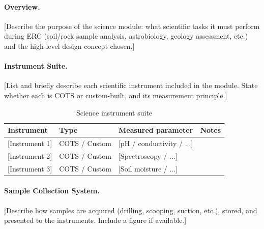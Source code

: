 %

\paragraph{Overview.}
[Describe the purpose of the science module: what scientific tasks it must
perform during ERC (soil/rock sample analysis, astrobiology, geology assessment,
etc.) and the high-level design concept chosen.]

\paragraph{Instrument Suite.}
[List and briefly describe each scientific instrument included in the module.
State whether each is COTS or custom-built, and its measurement principle.]

\begin{table}[H]
    \centering
    \caption{Science instrument suite}
    \label{tab:science_instruments}
    \begin{tabular}{L{3cm} L{2cm} L{4cm} L{3cm}}
        \toprule
        \textbf{Instrument}       & \textbf{Type} & \textbf{Measured parameter} & \textbf{Notes} \\
        \midrule
        {[Instrument 1]} & COTS / Custom & [pH / conductivity / ...] & \\
        {[Instrument 2]} & COTS / Custom & [Spectroscopy / ...] & \\
        {[Instrument 3]} & COTS / Custom & [Soil moisture / ...] & \\
        \bottomrule
    \end{tabular}
\end{table}

\paragraph{Sample Collection System.}
[Describe how samples are acquired (drilling, scooping, suction, etc.),
stored, and presented to the instruments. Include a figure if available.]

